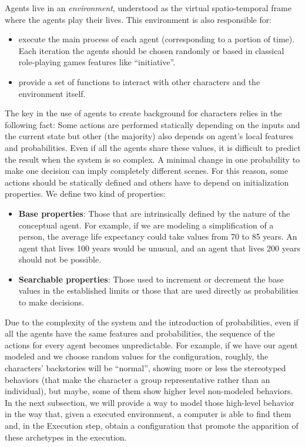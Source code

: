 \documentclass[letterpaper]{article}
\begin{document}
Agents live in an {\em environment}, understood as the virtual spatio-temporal frame where the agents play their lives. This environment is also responsible for:
\begin{itemize}
\item execute the main process of each agent (corresponding to a portion of time). Each iteration the agents should be chosen randomly or based in classical role-playing games features like ``initiative''.
\item provide a set of functions to interact with other characters and the environment itself.
\end{itemize}



The key in the use of agents to create background for characters relies in the following fact: Some actions are performed statically depending on the inputs and the current state but other (the majority) also depends on agent's local features and probabilities. Even if all the agents share these values, it is difficult to predict the result when the system is so complex. A minimal change in one probability to make one decision can imply completely different scenes.
For this reason, some actions should be statically defined and others have to depend on initialization properties. We define two kind of properties:


\begin{itemize}
\item \textbf{Base properties}: Those that are intrinsically defined by the nature of the conceptual agent. For example, if we are modeling a simplification of a person, the average life expectancy could take values from 70 to 85 years. An agent that lives 100 years would be unusual, and an agent that lives 200 years should not be possible.
\item \textbf{Searchable properties}: Those used to increment or decrement the base values in the established limits or those that are used directly as probabilities to make decisions.
\end{itemize}


Due to the complexity of the system and the introduction of probabilities, even if all the agents have the same features and probabilities, the sequence of the actions for every agent becomes unpredictable. For example, if we have our agent modeled and we choose random values for the configuration, roughly, the characters' backstories will be ``normal'', showing more or less the stereotyped behaviors (that make the character a group representative rather than an individual), but maybe, some of them show higher level non-modeled behaviors. In the next subsection, we will provide a way to model those high-level behavior in the way that, given a executed environment, a computer is able to find them 
and, in the Execution step, obtain a configuration that promote the apparition of these archetypes in the execution.
\end{document}
